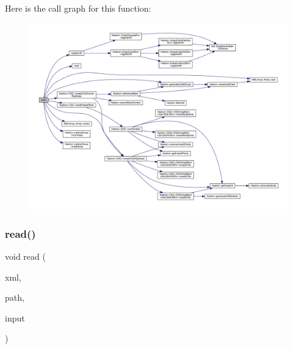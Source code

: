 Here is the call graph for this function\+:
\nopagebreak
\begin{figure}[H]
\begin{center}
\leavevmode
\includegraphics[width=350pt]{d1/de2/adat-devel_2main_2irreputils_2cgs__table_8cc_a3c04138a5bfe5d72780bb7e82a18e627_cgraph}
\end{center}
\end{figure}
\mbox{\label{adat-devel_2main_2irreputils_2cgs__table_8cc_a0bc6eab6ee4938b14f32a0a933d96dd9}} 
\subsubsection{\texorpdfstring{read()}{read()}}
{\footnotesize\ttfamily void read (\begin{DoxyParamCaption}\item[{X\+M\+L\+Reader \&}]{xml,  }\item[{const string \&}]{path,  }\item[{\mbox{\hyperlink{structtest__cgs__t}{test\+\_\+cgs\+\_\+t}} \&}]{input }\end{DoxyParamCaption})}

